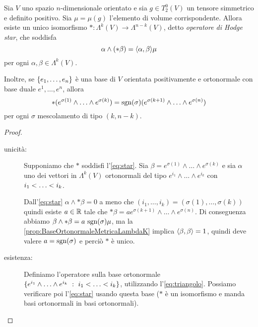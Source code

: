 \begin{proposition} 
	Sia $V$ uno spazio $n$-dimensionale orientato e sia $g\in T^0_2(V)$ un tensore simmetrico e definito positivo.
	Sia $\mu=\mu(g)$ l'elemento di volume corrispondente.
	Allora esiste un unico isomorfismo $*:\Lambda^k(V) \to \Lambda^{n-k}(V)$, detto \emph{operatore di Hodge star}, che soddisfa
	\begin{equation} \label{eq:star}
	 \alpha \wedge (* \beta)= \Scal \alpha\beta \mu
	\end{equation}
	per ogni $\alpha,\beta \in\Lambda^k(V)$.
	
	Inoltre, se $\{\seqb en, \}$ è una base di $V$ orientata positivamente e ortonormale con base duale $e^1, \dots ,e^n$, allora
	\begin{equation}\label{eq:triangolo}
	*(e^{\sigma(1)}\wedge\ldots\wedge e^{\sigma(k)}) = \sgn(\sigma) (e^{\sigma(k+1)}\wedge\ldots\wedge e^{\sigma(n)})
	\end{equation}
	per ogni $\sigma$ mescolamento di tipo $(k,n-k)$.
\end{proposition}
\begin{proof} %
	\begin{description}
		\item [unicità:] Supponiamo che $*$ soddisfi l'\cref{eq:star}. Sia $\beta = e^{\sigma(1)} \wedge\ldots\wedge e^{\sigma(k)}$ e sia $\alpha$ uno dei vettori in $\Lambda^k(V)$ ortonormali del tipo $e^{i_1}\wedge\ldots\wedge e^{i_k}$ con $\seqb ik<$.
		
		Dall'\cref{eq:star} $\alpha \wedge * \beta=0$ a meno che $(i_1, \ldots,i_k)=(\sigma(1),\ldots,\sigma(k))$
		quindi esiste $a\in\R$ tale che $*\beta = a e^{\sigma(k+1)} \wedge\ldots\wedge e^{\sigma(n)}$.
		Di conseguenza abbiamo $\beta\wedge * \beta = a\ \sgn(\sigma) \mu$, ma la \cref{prop:BaseOrtonormaleMetricaLambdaK} implica $\Scal \beta\beta=1$, quindi deve valere $a = \sgn(\sigma)$ e perciò $*$ è unico.
		
		\item [esistenza:] Definiamo l'operatore sulla base ortonormale $\{e^{i_1}\wedge\ldots\wedge e^{i_k} \suchthat \seqb ik <\}$, utilizzando l'\cref{eq:triangolo}. Possiamo verificare poi l'\cref{eq:star} usando questa base ($*$ è un isomorfismo e manda basi ortonormali in basi ortonormali). %
	\end{description}
\end{proof}

